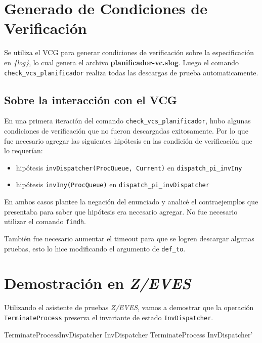 \documentclass{article}
\begin{document}
\section{Generado de Condiciones de Verificación}

Se utiliza el VCG para generar condiciones de verificación sobre la especificación en \textit{\{log\}}, lo cual genera el archivo \textbf{planificador-vc.slog}. Luego el comando \verb|check_vcs_planificador| realiza todas las descargas de prueba automaticamente.

\subsection*{Sobre la interacción con el VCG}

En una primera iteración del comando \verb|check_vcs_planificador|, hubo algunas condiciones de verificación que no fueron descargadas exitosamente. Por lo que fue necesario agregar las siguientes hipótesis en las condición de verificación que lo requerían:

\begin{itemize}
    \item hipótesis \verb|invDispatcher(ProcQueue, Current)| en \verb|dispatch_pi_invIny|
    \item hipótesis \verb|invIny(ProcQueue)| en \verb|dispatch_pi_invDispatcher|
\end{itemize}

En ambos casos plantee la negación del enunciado y analicé el contraejemplos que presentaba para saber que hipótesis era necesario agregar. No fue necesario utilizar el comando \verb|findh|.

También fue necesario aumentar el timeout para que se logren descargar algunas pruebas, esto lo hice modificando el argumento de \verb|def_to|.

\section{Demostración en \textit{Z/EVES}}

Utilizando el asistente de pruebas \textit{Z/EVES}, vamos a demostrar que la operación \verb|TerminateProcess| preserva el invariante de estado \verb|InvDispatcher|.

\begin{theorem}{TerminateProcessInvDispatcher}
    InvDispatcher \land TerminateProcess \implies InvDispatcher'
\end{theorem}
\end{document}
